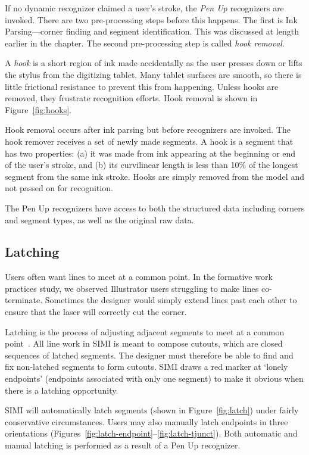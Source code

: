 If no dynamic recognizer claimed a user's stroke, the \textit{Pen Up}
recognizers are invoked. There are two pre-processing steps before
this happens. The first is Ink Parsing---corner finding and segment
identification. This was discussed at length earlier in the
chapter. The second pre-processing step is called \textit{hook
  removal}.

A \textit{hook} is a short region of ink made accidentally as the user
presses down or lifts the stylus from the digitizing tablet. Many
tablet surfaces are smooth, so there is little frictional resistance
to prevent this from happening. Unless hooks are removed, they
frustrate recognition efforts. Hook removal is shown in
Figure~\ref{fig:hooks}.



Hook removal occurs after ink parsing but before recognizers are
invoked. The hook remover receives a set of newly made segments. A
hook is a segment that has two properties: (a) it was made from ink
appearing at the beginning or end of the user's stroke, and (b) its
curvilinear length is less than 10\% of the longest segment from the
same ink stroke. Hooks are simply removed from the model and not
passed on for recognition.

The Pen Up recognizers have access to both the structured data
including corners and segment types, as well as the original raw data.

\subsection{Latching}



Users often want lines to meet at a common point. In the formative
work practices study, we observed Illustrator users struggling to make
lines co-terminate. Sometimes the designer would simply extend lines
past each other to ensure that the laser will correctly cut the
corner.

Latching is the process of adjusting adjacent segments to meet at a
common point~\cite{herot-latch-corners}. All line work in SIMI is meant
to compose cutouts, which are closed sequences of latched
segments. The designer must therefore be able to find and fix
non-latched segments to form cutouts. SIMI draws a red marker at
`lonely endpoints' (endpoints associated with only one segment) to
make it obvious when there is a latching opportunity.

SIMI will automatically latch segments (shown in
Figure~\ref{fig:latch}) under fairly conservative circumstances. Users
may also manually latch endpoints in three orientations
(Figures~\ref{fig:latch-endpoint}--\ref{fig:latch-tjunct}). Both
automatic and manual latching is performed as a result of a Pen Up
recognizer.

